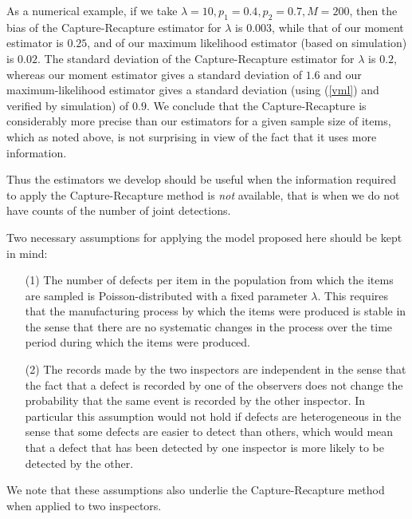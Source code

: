 \documentclass[a4paper,10pt,twoside]{article}
\begin{document}
{As a numerical example, if we take $\lambda=10,p_1=0.4,p_2=0.7,M=200$, then the bias of the Capture-Recapture estimator for $\lambda$ 
is $0.003$, while that of our moment estimator is $0.25$, and of our maximum likelihood estimator (based on simulation)
is $0.02$.
The standard deviation of the Capture-Recapture estimator for $\lambda$ is
$0.2$, whereas our moment estimator gives a standard deviation of $1.6$ and our maximum-likelihood estimator gives a standard 
deviation (using (\ref{vml}) and verified by simulation) of $0.9$. We conclude that the Capture-Recapture is considerably more precise than our estimators for a given sample size of items, 
which as noted above, is not surprising in view of the fact that it uses more information.

Thus the estimators we develop should be useful when the information required to apply the Capture-Recapture method is {\it{not}} available,
that is when we do not have counts of the number of joint detections.

Two necessary assumptions for applying the model proposed here should be kept in mind:
\begin{itemize}
	\item [(1)] The number of defects per item in the population from which the items are sampled is Poisson-distributed with a fixed parameter $\lambda$. This requires that the manufacturing process by which the items were produced is stable in the sense that there are no systematic changes in the process over the time period during which the items were produced.
	\item [(2)] The records made by the two inspectors are independent in the sense that the fact 
	that a defect is recorded by one of the observers does not change the probability that the same event is recorded
	by the other inspector. In particular this assumption would not hold if defects are heterogeneous in the sense that some defects are 
	easier to detect than others, which would mean that a defect that has been detected by one inspector is more likely to be
	detected by the other. 
\end{itemize}

We note that these assumptions also underlie the Capture-Recapture method when applied to two inspectors.




}
\end{document}
